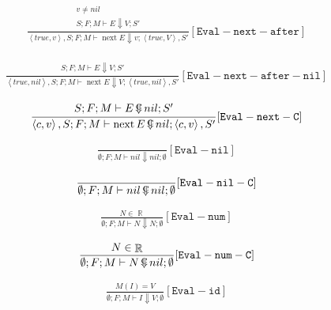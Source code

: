 \documentclass{scrartcl}
\DeclareMathOperator{\nextop}{next}
\DeclareMathOperator{\numtype}{\mathbb{R}}
\DeclareMathOperator{\ceval}{\overset{C}{\smash{\Downarrow}}}
\begin{document}
    \begin{align*}
    \frac{
        \begin{matrix}
        v \neq nil \\
        S; F; M \vdash E \Downarrow V; S'
        \end{matrix}
    }{
        \left<true, v \right>, S; F; M \vdash \nextop E  \Downarrow v; \left< true, V \right>, S'
    }[\mathtt{Eval-next-after}]
    \end{align*}
    
    \begin{align*}
    \frac{
        \begin{matrix}
        S; F; M \vdash E \Downarrow V; S'
        \end{matrix}
    }{
        \left<true, nil \right>, S; F; M \vdash \nextop E  \Downarrow V; \left< true, nil \right>, S'
    }[\mathtt{Eval-next-after-nil}]
    \end{align*}
    
    \begin{align*}
    \frac{
        \begin{matrix}
        S; F; M \vdash E \ceval nil; S'
        \end{matrix}
    }{
        \left<c, v\right>, S; F; M \vdash \nextop E   \ceval nil; \left<c, v\right>, S'
    }[\mathtt{Eval-next-C}]
    \end{align*}
    
    \begin{align*}
    \frac{}{
        \emptyset; F; M \vdash nil \Downarrow nil; \emptyset
    }[\mathtt{Eval-nil}]
    \end{align*}
    
    \begin{align*}
    \frac{}{
        \emptyset; F; M \vdash nil  \ceval nil; \emptyset
    }[\mathtt{Eval-nil-C}]
    \end{align*}
    
    \begin{align*}
    \frac{
        N \in \numtype
    }{
        \emptyset; F; M \vdash N \Downarrow N; \emptyset
    }[\mathtt{Eval-num}]
    \end{align*}
    
    \begin{align*}
    \frac{
        N \in \numtype
    }{
        \emptyset; F; M \vdash N  \ceval nil; \emptyset
    }[\mathtt{Eval-num-C}]
    \end{align*}

    \begin{align*}
    \frac{
        M(I) = V
    }{
        \emptyset; F; M \vdash I \Downarrow V; \emptyset
    }[\mathtt{Eval-id}]
    \end{align*}
    
\end{document}

